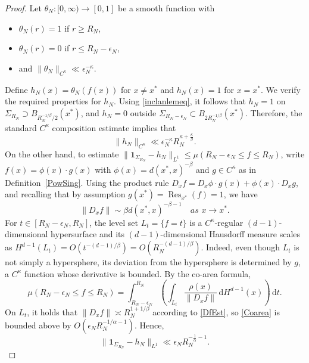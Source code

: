 \documentclass[11pt,twoside,a4paper,reqno]{amsart}
\newcommand{\Res}{\operatorname{Res}}
\renewcommand{\d}{\, \text{d}}
\def\one{{\mathbf{1}}}
\begin{document}
\begin{proof}
Let $\theta_N:[0,\infty) \rightarrow [0,1]$ be a smooth function with
\begin{itemize}
\item $\theta_N(r)=1$ if $r\geq R_N$,
\item $\theta_N(r)=0$ if $r\leq R_N-\epsilon_N$,
\item and $\|\theta_N\|_{C^{\kappa}} \ll \epsilon_N^{-\kappa}$.
\end{itemize}
Define $h_N(x)=\theta_N(f(x))$ for $x\neq x^*$ and $h_N(x)=1$ for $x=x^*.$
We verify the required properties for $h_N$. Using \eqref{inclanlemeq}, it follows that $h_N= 1$ on $\Sigma_{R_N} \supset B_{R_N^{-1/\beta}/2}(x^*)$, and $h_N= 0$ outside $\Sigma_{R_N-\epsilon_N} \subset B_{2R_N^{-1/\beta}}(x^*)$. Therefore, the standard $C^\kappa$ composition estimate implies that
\begin{equation*}
\|h_N\|_{C^{\kappa}} \ll \epsilon_N^{-\kappa} R_N^{\kappa+\frac{\kappa}{\beta}}.
\end{equation*}
On the other hand, to estimate $\|\one_{\Sigma_{R_N}}-h_N\|_{L^1} \leq \mu(R_N-\epsilon_N \leq f \leq R_N)$, write $f(x) = \phi(x) \cdot g(x)$ with $\phi(x) = d(x^*, x)^{-\beta}$ and $g\in C^{\kappa}$ as in Definition~\ref{PowSing}. Using the product rule $D_x f=D_x \phi \cdot g(x)+\phi(x) \cdot D_x g$,
and recalling that by assumption $g(x^*)=\Res_{x^*} (f)=1$, we have
\begin{equation}\label{DfEst}
\| D_x f \| \sim \beta d(x^*,x)^{-\beta-1} \quad \textit{as } x\rightarrow x^*.
\end{equation}
For $t \in [R_N-\epsilon_N, R_N]$, the level set $L_t=\{f=t\}$ is a $C^{\kappa}$-regular $(d-1)$-dimensional hypersurface and its $(d-1)$-dimensional Hausdorff measure scales as $H^{d-1}(L_t)=O\left(t^{-(d-1)/\beta}\right)=O\left(R_N^{-(d-1)/\beta}\right)$. Indeed, even though $L_t$ is not simply a hypersphere, its deviation from the hypersphere is determined by $g$, a $C^{\kappa}$ function whose derivative is bounded. By the co-area formula,
\begin{equation}\label{Coarea}
\mu(R_N - \epsilon_N \leq f \leq R_N )
= \int_{R_N - \epsilon_N}^{R_N} \left( \int_{L_t} \frac{\rho(x)}{\|D_x f\|} \d H^{d-1}(x) \right)\d t.
\end{equation}
On $L_t$, it holds that $\|D_x f\| \asymp R_N^{1 + 1/\beta}$ according to \eqref{DfEst}, so \eqref{Coarea} is bounded above by $O\left(\epsilon_N R_N^{-1/\alpha-1}\right)$. Hence,
\begin{equation*}
\| \one_{\Sigma_{R_N}}-h_N\|_{L^1} \ll \epsilon_N R_N^{-\frac{1}{\alpha}-1}.
\end{equation*}
\end{proof}
\end{document}
